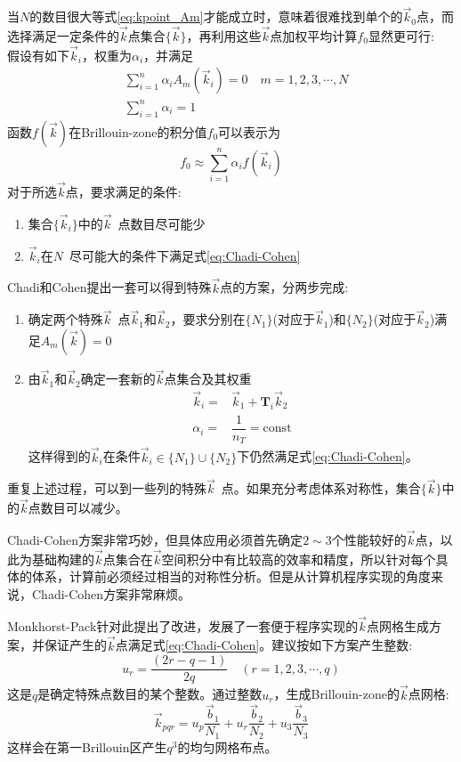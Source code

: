 当$N$的数目很大等式\eqref{eq:kpoint_Am}才能成立时，意味着很难找到单个的$\vec k_0$点，而选择满足一定条件的$\vec k$点集合$\{\vec k\}$，再利用这些$\vec k$点加权平均计算$f_0$显然更可行:\\
假设有如下$\vec k_i$，权重为$\alpha_i$，并满足
	\begin{equation}
		\begin{aligned}
			&\sum_{i=1}^n\alpha_iA_m(\vec k_i)=0\quad m=1,2,3,\cdots,N\\
			&\sum_{i=1}^n\alpha_i=1
		\end{aligned}
		\label{eq:Chadi-Cohen}
	\end{equation}
函数$f(\vec k)$在\textrm{Brillouin-zone}的积分值$f_0$可以表示为$$f_0\approx\sum_{i=1}^n\alpha_if(\vec k_i)$$
对于所选$\vec k$点，要求满足的条件:~
\begin{enumerate}
	\item 集合$\{\vec k_i\}$中的$\vec k$~点数目尽可能少
	\item $\vec k_i$在$N$~尽可能大的条件下满足式\eqref{eq:Chadi-Cohen}
\end{enumerate}
\textrm{Chadi}和\textrm{Cohen}提出一套可以得到特殊$\vec k$点的方案，分两步完成:
\begin{enumerate}
	\item 确定两个特殊$\vec k$~点$\vec k_1$和$\vec k_2$，要求分别在$\{N_1\}$(对应于$\vec k_1$)和$\{N_2\}$(对应于$\vec k_2$)满足$A_m(\vec k)=0$
	\item 由$\vec k_1$和$\vec k_2$确定一套新的$\vec k$点集合及其权重
		\begin{equation}
			\begin{aligned}
				\vec k_i=&\vec k_1+\mathbf{T}_i\vec k_2\\
				\alpha_i=&\dfrac1{n_T}=\mathrm{const}
			\end{aligned}
			\label{eq:kpoint_spec_add}
		\end{equation}
		这样得到的$\vec k_i$在条件$\vec k_i\in\{N_1\}\cup\{N_2\}$下仍然满足式\eqref{eq:Chadi-Cohen}。
\end{enumerate}
重复上述过程，可以到一些列的特殊$\vec k$~点。如果充分考虑体系对称性，集合$\{\vec k\}$中的$\vec k$点数目可以减少。

\textrm{Chadi-Cohen}方案非常巧妙，但具体应用必须首先确定$2\sim3$个性能较好的$\vec k$点，以此为基础构建的$\vec k$点集合在$\vec k$空间积分中有比较高的效率和精度，所以针对每个具体的体系，计算前必须经过相当的对称性分析。但是从计算机程序实现的角度来说，\textrm{Chadi-Cohen}方案非常麻烦。

\textrm{Monkhorst-Pack}\cite{PRB13-5188_1976}针对此提出了改进，发展了一套便于程序实现的$\vec k$点网格生成方案，并保证产生的$\vec k$点满足式\eqref{eq:Chadi-Cohen}。建议按如下方案产生整数:~
\begin{equation}
	u_r=\dfrac{(2r-q-1)}{2q}\quad(r=1,2,3,\cdots,q)
	\label{eq:kpoint_MP_Nu}
\end{equation}
这是$q$是确定特殊点数目的某个整数。通过整数$u_r$，生成\textrm{Brillouin-zone}的$\vec k$点网格:~
\begin{equation}
	\vec k_{pqr}=u_p\dfrac{\vec b_1}{N_1}+u_r\dfrac{\vec b_2}{N_2}+u_3\dfrac{\vec b_3}{N_3}
	\label{eq:kpoint_MP}
\end{equation}
这样会在第一\textrm{Brillouin}区产生$q^3$的均匀网格布点。

